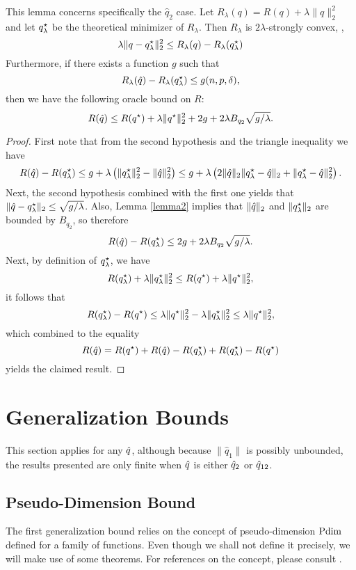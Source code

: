 \documentclass{article}
\begin{document}
\begin{lemma}
  \label{lemma3}
  This lemma concerns specifically the $\hat q_2$ case. Let
  $R_\lambda(q) = R(q) + \lambda\|q\|_2^2$ and let $q^\star_\lambda$ be the theoretical
  minimizer of $R_\lambda$. Then $R_\lambda$ is $2\lambda$-strongly convex, \ie,
  \[
    \lambda\|q - q^\star_\lambda\|_2^2 \leq R_\lambda(q) - R_\lambda(q^\star_\lambda)
  \]
  Furthermore, if there exists a function $g$ such that
  \[
    R_\lambda(\hat q) - R_\lambda(q^\star_\lambda) \leq g(n,p,\delta),
  \]
  then we have the following oracle bound on $R$:
  \[
    R(\hat q) \leq R(q^\star) + \lambda\|q^\star\|^2_2 + 2g + 2\lambda B_{q_2}\sqrt{g/\lambda}.
  \]
\end{lemma}
\begin{proof}
  First note that from the second hypothesis and the triangle inequality we have
  \[
    R(\hat q) - R(q^\star_\lambda) \leq g + \lambda\left(\|q^\star_\lambda\|^2_2 - \|\hat q\|^2_2\right) \leq g +
    \lambda\left(2\|\hat q\|_2\|q^\star_\lambda-\hat q\|_2 + \|q^\star_\lambda-\hat q\|^2_2\right).
  \]
  Next, the second hypothesis combined with the first one yields that $\|\hat q - q^\star_\lambda\|_2
  \leq \sqrt{g/\lambda}$. Also, Lemma \ref{lemma2} implies that $\|\hat q\|_2$ and
  $\|q^\star_\lambda\|_2$ are bounded by $B_{q_2}$, so therefore
  \[
    R(\hat q) - R(q^\star_\lambda) \leq 2g + 2\lambda B_{q_2}\sqrt{g/\lambda}.
  \]
  Next, by definition of $q^\star_\lambda$, we have
  \[
    R(q^\star_\lambda) + \lambda\|q^\star_\lambda\|_2^2 \leq R(q^\star) + \lambda\|q^\star\|_2^2,
  \]
  it follows that
  \[
    R(q^\star_\lambda) - R(q^\star) \leq \lambda\|q^\star\|_2^2 - \lambda\|q^\star_\lambda\|_2^2 \leq \lambda\|q^\star\|^2_2,
  \]
  which combined to the equality
  \[
    R(\hat q) = R(q^\star) + R(\hat q) - R(q^\star_\lambda) + R(q^\star_\lambda) - R(q^\star)
  \]
  yields the claimed result.
\end{proof}


\section{Generalization Bounds}

This section applies for any $\hat q$, although because $\|\hat q_1\|$ is possibly unbounded,
the results presented are only finite when $\hat q$ is either $\hat q_2$ or $\hat q_{12}$.


\subsection{Pseudo-Dimension Bound}

The first generalization bound relies on the concept of pseudo-dimension $\operatorname{Pdim}$ defined
for a family of functions. Even though we shall not define it precisely, we will make use
of some theorems. For references on the concept, please consult
\cite{mohri2012foundations,anthony2009neural,vidyasagar2013learning}.
\end{document}
